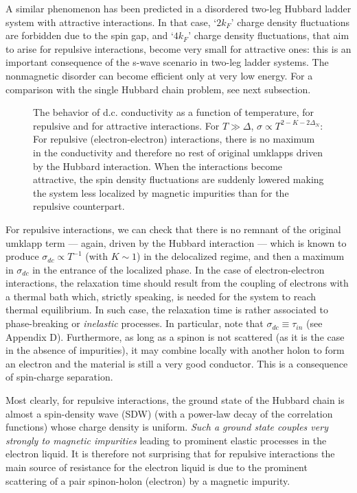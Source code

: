 A similar
phenomenon has been predicted in a disordered two-leg Hubbard ladder 
system with
attractive interactions\cite{Orignac}. In that case, `$2k_F$' 
charge density fluctuations are forbidden due to the spin gap, and
`$4k_F$' charge density
fluctuations, that aim to arise for repulsive interactions, become
very small for attractive ones\cite{Schulz}: this is
an important consequence of the
s-wave scenario in two-leg ladder systems. The nonmagnetic disorder can
become efficient only at very low energy.
For a comparison with the single Hubbard chain problem, see next subsection.
\vskip 0.3cm
\begin{figure}
\centerline{}
\vskip 0.5cm
\caption{The behavior of d.c. conductivity as a function of temperature,
for repulsive and for attractive interactions. For $T\gg\Delta$,
$\sigma\propto
T^{2-K-2\Delta_N}$: For repulsive (electron-electron)
interactions, there is no maximum in
the conductivity and therefore no rest of original umklapps driven by the
Hubbard interaction. When the interactions
become attractive, the spin density fluctuations are suddenly lowered
making the system less localized by magnetic impurities than for
the repulsive
counterpart.}
\end{figure}
\vskip 0.03cm
For repulsive interactions, we can check that
there is no remnant of the original
umklapp term --- again, driven by the Hubbard
interaction ---
which is known to produce $\sigma_{dc}\propto T^{-1}$ (with $K\sim 1$) 
in the delocalized
regime, and then a maximum in $\sigma_{dc}$ in the entrance of the localized
phase. In the case of electron-electron interactions, the
relaxation time should result from
the coupling of electrons with a
thermal bath which, strictly speaking, is needed for the system to reach
thermal equilibrium\cite{A-R}. In such case, the relaxation time is 
rather associated to phase-breaking
or {\it inelastic} processes\cite{Giam3}. In particular, note that 
$\sigma_{dc}\equiv\tau_{in}$ (see Appendix D).
Furthermore, as long as a spinon is not scattered (as it is the case in the
absence of impurities), 
it may combine locally with another
holon to form an electron and the material is still a very good conductor. 
This is a consequence of spin-charge separation\cite{Anderson-Ren}.

Most clearly, for repulsive interactions, the ground state of the Hubbard chain
is almost a spin-density wave
(SDW) (with a power-law decay of the correlation functions) whose
charge density is uniform. 
{\it Such a ground state couples very strongly to magnetic
impurities} leading to prominent elastic processes in the
electron liquid. It is therefore not surprising that for
repulsive interactions the main source of resistance for the
electron liquid is due to the prominent scattering of 
a pair spinon-holon (electron) by a magnetic impurity. 

